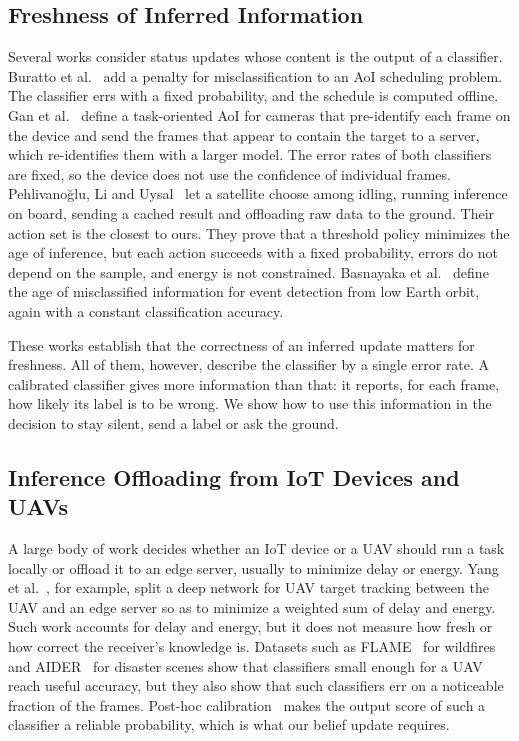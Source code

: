 \documentclass[5p,twocolumn]{elsarticle}
\theoremstyle{remark}
\begin{document}
\subsection{Freshness of Inferred Information}
Several works consider status updates whose content is the output of a classifier. Buratto et al.~\cite{buratto2023misclass} add a penalty for misclassification to an AoI scheduling problem. The classifier errs with a fixed probability, and the schedule is computed offline. Gan et al.~\cite{gan2025taoi} define a task-oriented AoI for cameras that pre-identify each frame on the device and send the frames that appear to contain the target to a server, which re-identifies them with a larger model. The error rates of both classifiers are fixed, so the device does not use the confidence of individual frames. Pehlivano\u{g}lu, Li and Uysal~\cite{pehlivanoglu2026orbit} let a satellite choose among idling, running inference on board, sending a cached result and offloading raw data to the ground. Their action set is the closest to ours. They prove that a threshold policy minimizes the age of inference, but each action succeeds with a fixed probability, errors do not depend on the sample, and energy is not constrained. Basnayaka et al.~\cite{basnayaka2025aomi} define the age of misclassified information for event detection from low Earth orbit, again with a constant classification accuracy.

These works establish that the correctness of an inferred update matters for freshness. All of them, however, describe the classifier by a single error rate. A calibrated classifier gives more information than that: it reports, for each frame, how likely its label is to be wrong. We show how to use this information in the decision to stay silent, send a label or ask the ground.

\subsection{Inference Offloading from IoT Devices and UAVs}
A large body of work decides whether an IoT device or a UAV should run a task locally or offload it to an edge server, usually to minimize delay or energy. Yang et al.~\cite{yang2020uav}, for example, split a deep network for UAV target tracking between the UAV and an edge server so as to minimize a weighted sum of delay and energy. Such work accounts for delay and energy, but it does not measure how fresh or how correct the receiver's knowledge is. Datasets such as FLAME~\cite{shamsoshoara2021flame} for wildfires and AIDER~\cite{kyrkou2020aider} for disaster scenes show that classifiers small enough for a UAV reach useful accuracy, but they also show that such classifiers err on a noticeable fraction of the frames. Post-hoc calibration~\cite{guo2017calibration} makes the output score of such a classifier a reliable probability, which is what our belief update requires.
\end{document}
